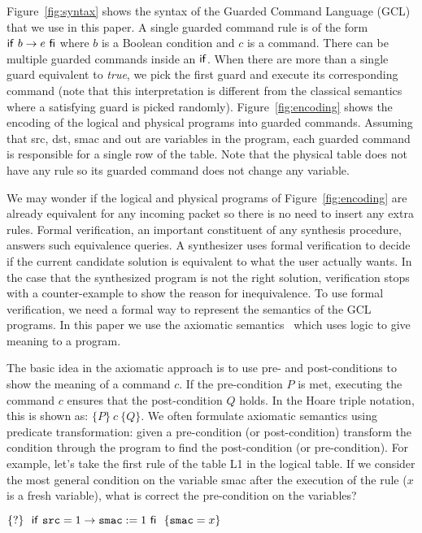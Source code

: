 Figure~\ref{fig:syntax} shows the syntax of the Guarded Command Language (GCL) 
that we use in this paper.
A single guarded command rule is of the form $\mathsf{if}~{b \to e}~\mathsf{fi}$ where $b$ is a Boolean
condition and $c$ is a command.
There can be multiple guarded commands inside an $\mathsf{if}$.
When there are more than a single guard equivalent to {\it true},
we pick the first guard and execute its corresponding command 
(note that this interpretation is different from the classical semantics where 
a satisfying guard is picked randomly).
Figure~\ref{fig:encoding} shows the encoding of the logical and physical programs into 
guarded commands.
Assuming that {\ttfamily src}, {\ttfamily dst}, {\ttfamily smac} and {\ttfamily out}
are variables in the program, each guarded command is responsible for a single row 
of the table.
Note that the physical table does not have any rule so its guarded command does not 
change any variable.

We may wonder if the logical and physical programs of Figure~\ref{fig:encoding}
are already equivalent for any incoming packet so there is no need to insert any extra rules.
Formal verification, an important constituent of any synthesis procedure, answers such equivalence queries.
A synthesizer uses formal verification to decide if the current candidate solution is equivalent 
to what the user actually wants.
In the case that the synthesized program is not the right solution, verification stops with a counter-example to show
the reason for inequivalence.
To use formal verification, we need a formal way to represent the semantics of the GCL programs.
In this paper we use the axiomatic semantics~\cite{hoare1969} which uses logic to give meaning to a program.

The basic idea in the axiomatic approach is to use pre- and post-conditions to show the 
meaning of a command $c$.
If the pre-condition $P$ is met, executing the command $c$ ensures that the post-condition $Q$ holds.
In the Hoare triple notation, this is shown as: $\{P\}~c~\{Q\}$.
We often formulate axiomatic semantics using predicate transformation: given a pre-condition (or post-condition)
transform the condition through the program to find the post-condition (or pre-condition).
For example, let's take the first rule of the table {\ttfamily L1} in the logical table.
If we consider the most general condition on the variable {\ttfamily smac} after the
execution of the rule ($x$ is a fresh variable), what is correct the pre-condition on the variables?

\begin{center}
$
\{?\} ~~ \mathsf{if}~{\mbox{\ttfamily src} = 1 \to \mbox{\ttfamily smac} := 1}~\mathsf{fi} ~~ \{\mbox{\ttfamily smac} = x\}
$ 
\end{center}


